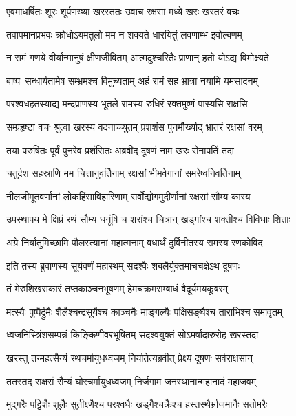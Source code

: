 
\twolineshloka
{एवमाधर्षितः शूरः शूर्पणख्या खरस्ततः}
{उवाच रक्षसां मध्ये खरः खरतरं वचः} %

\twolineshloka
{तवापमानप्रभवः क्रोधोऽयमतुलो मम}
{न शक्यते धारयितुं लवणाम्भ इवोल्बणम्} %

\twolineshloka
{न रामं गणये वीर्यान्मानुषं क्षीणजीवितम्}
{आत्मदुश्चरितैः प्राणान् हतो योऽद्य विमोक्ष्यते} %

\twolineshloka
{बाष्पः सन्धार्यतामेष सम्भ्रमश्च विमुच्यताम्}
{अहं रामं सह भ्रात्रा नयामि यमसादनम्} %

\twolineshloka
{परश्वधहतस्याद्य मन्दप्राणस्य भूतले}
{रामस्य रुधिरं रक्तमुष्णं पास्यसि राक्षसि} %

\twolineshloka
{सम्प्रहृष्टा वचः श्रुत्वा खरस्य वदनाच्च्युतम्}
{प्रशशंस पुनर्मौर्ख्याद् भ्रातरं रक्षसां वरम्} %

\twolineshloka
{तया परुषितः पूर्वं पुनरेव प्रशंसितः}
{अब्रवीद् दूषणं नाम खरः सेनापतिं तदा} %

\twolineshloka
{चतुर्दश सहस्राणि मम चित्तानुवर्तिनाम्}
{रक्षसां भीमवेगानां समरेष्वनिवर्तिनाम्} %

\twolineshloka
{नीलजीमूतवर्णानां लोकहिंसाविहारिणाम्}
{सर्वोद्योगमुदीर्णानां रक्षसां सौम्य कारय} %

\twolineshloka
{उपस्थापय मे क्षिप्रं रथं सौम्य धनूंषि च}
{शरांश्च चित्रान् खड्गांश्च शक्तीश्च विविधाः शिताः} %

\twolineshloka
{अग्रे निर्यातुमिच्छामि पौलस्त्यानां महात्मनाम्}
{वधार्थं दुर्विनीतस्य रामस्य रणकोविद} %

\twolineshloka
{इति तस्य ब्रुवाणस्य सूर्यवर्णं महारथम्}
{सदश्वैः शबलैर्युक्तमाचचक्षेऽथ दूषणः} %

\twolineshloka
{तं मेरुशिखराकारं तप्तकाञ्चनभूषणम्}
{हेमचक्रमसम्बाधं वैदूर्यमयकूबरम्} %

\twolineshloka
{मत्स्यैः पुष्पैर्द्रुमैः शैलैश्चन्द्रसूर्यैश्च काञ्चनैः}
{माङ्गल्यैः पक्षिसङ्घैश्च ताराभिश्च समावृतम्} %

\twolineshloka
{ध्वजनिस्त्रिंशसम्पन्नं किङ्किणीवरभूषितम्}
{सदश्वयुक्तं सोऽमर्षादारुरोह खरस्तदा} %

\twolineshloka
{खरस्तु तन्महत्सैन्यं रथचर्मायुधध्वजम्}
{निर्यातेत्यब्रवीत् प्रेक्ष्य दूषणः सर्वराक्षसान्} %

\twolineshloka
{ततस्तद् राक्षसं सैन्यं घोरचर्मायुधध्वजम्}
{निर्जगाम जनस्थानान्महानादं महाजवम्} %

\twolineshloka
{मुद्गरैः पट्टिशैः शूलैः सुतीक्ष्णैश्च परश्वधैः}
{खड्गैश्चक्रैश्च हस्तस्थैर्भ्राजमानैः सतोमरैः} %

